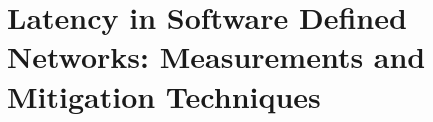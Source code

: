 \section{Latency in Software Defined Networks: Measurements and Mitigation Techniques}
\label{mazu}






%
